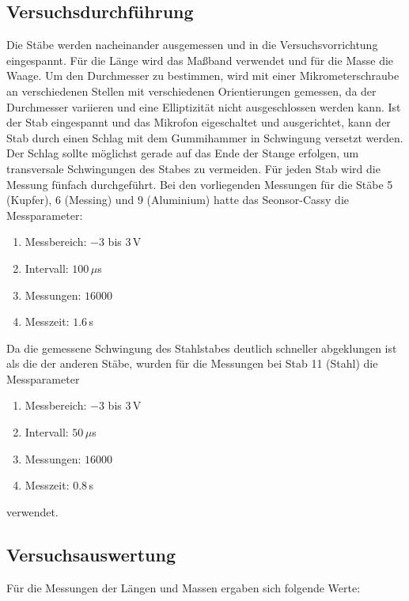 \documentclass[a4paper, 12pt]{scrartcl}
\begin{document}
\subsection{Versuchsdurchführung}

Die Stäbe werden nacheinander ausgemessen und in die Versuchsvorrichtung eingespannt. Für die Länge wird das Maßband verwendet und für die Masse die Waage. Um den Durchmesser zu bestimmen, wird mit einer Mikrometerschraube an verschiedenen Stellen mit verschiedenen Orientierungen gemessen, da der Durchmesser variieren und eine Elliptizität nicht ausgeschlossen werden kann. Ist der Stab eingespannt und das Mikrofon eigeschaltet und ausgerichtet, kann der Stab durch einen Schlag mit dem Gummihammer in Schwingung versetzt werden. Der Schlag sollte möglichst gerade auf das Ende der Stange erfolgen, um transversale Schwingungen des Stabes zu vermeiden. Für jeden Stab wird die Messung fünfach durchgeführt. Bei den vorliegenden Messungen für die Stäbe 5 (Kupfer), 6 (Messing) und 9 (Aluminium) hatte das Seonsor-Cassy die Messparameter:
\begin{enumerate}[-]
\item Messbereich: $-3$ bis $3\,$V
\item Intervall: $100\,\mu$s
\item Messungen: $16000$
\item Messzeit: $1.6\,$s
\end{enumerate}
Da die gemessene Schwingung des Stahlstabes deutlich schneller abgeklungen ist als die der anderen Stäbe, wurden für die Messungen bei Stab 11 (Stahl) die Messparameter
\begin{enumerate}[-]
\item Messbereich: $-3$ bis $3\,$V
\item Intervall: $50\,\mu$s
\item Messungen: $16000$
\item Messzeit: $0.8\,$s
\end{enumerate}
verwendet.

\subsection{Versuchsauswertung}

Für die Messungen der Längen und Massen ergaben sich folgende Werte:
\end{document}
